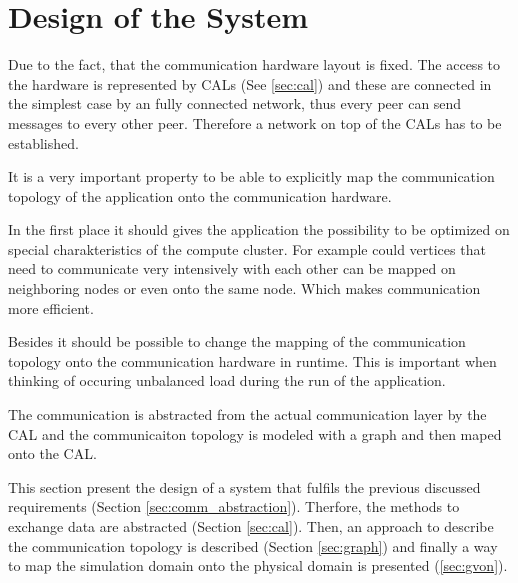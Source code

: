 \section{Design of the System}


Due to the fact, that the communication hardware layout is fixed. The access
to the hardware is represented by CALs (See \ref{sec:cal}) and these
are connected in the simplest case by an fully connected network, thus
every peer can send messages to every other peer. Therefore a network
on top of the CALs has to be established.

It is a very important property to be able to explicitly map the
communication topology of the application onto the communication
hardware.

In the first place it should gives the application the possibility to
be optimized on special charakteristics of the compute cluster. For
example could vertices that need to communicate very intensively with
each other can be mapped on neighboring nodes or even onto the same
node. Which makes communication more efficient.

Besides it should be possible to change the mapping of the
communication topology onto the communication hardware in
runtime. This is important when thinking of occuring unbalanced load
during the run of the application.

The communication is abstracted from the actual communication layer by
the CAL and the communicaiton topology is modeled with a graph and
then maped onto the CAL.


This section present the design of a system that fulfils the previous
discussed requirements (Section \ref{sec:comm_abstraction}). Therfore, the
methods to exchange data are abstracted (Section \ref{sec:cal}). Then,
an approach to describe the communication topology is described
(Section \ref{sec:graph}) and finally a way to map the simulation
domain onto the physical domain is presented (\ref{sec:gvon}).


